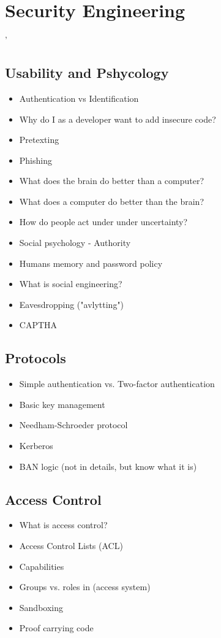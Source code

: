 \chapter{Security Engineering}'

\section{Usability and Pshycology}

	\begin{itemize}
		\item Authentication vs Identification
		\item Why do I as a developer want to add insecure code?
		\item Pretexting
		\item Phishing
		\item What does the brain do better than a computer?
		\item What does a computer do better than the brain?
		\item How do people act under under uncertainty?
		\item Social psychology - Authority
		\item Humans memory and password policy
		\item What is social engineering?
		\item Eavesdropping ("avlytting")
		\item CAPTHA
	\end{itemize}

\clearpage
\section{Protocols}
	\begin{itemize}
		\item Simple authentication vs. Two-factor authentication
		\item Basic key management
		\item Needham-Schroeder protocol
		\item Kerberos
		\item BAN logic (not in details, but know what it is)
	\end{itemize}

\section{Access Control}
	\begin{itemize}
		\item What is access control?
		\item Access Control Lists (ACL)
		\item Capabilities
		\item Groups vs. roles in (access system)
		\item Sandboxing
		\item Proof carrying code
	\end{itemize}

